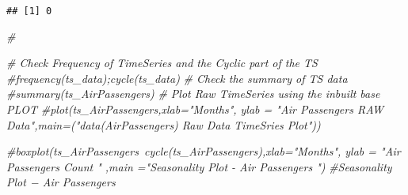 \documentclass[]{article}
\newenvironment{Shaded}{\begin{snugshade}}{\end{snugshade}}
\newcommand{\CommentTok}[1]{\textcolor[rgb]{0.56,0.35,0.01}{\textit{#1}}}
\begin{document}
\begin{verbatim}
## [1] 0
\end{verbatim}

\begin{Shaded}
\begin{Highlighting}[]
\CommentTok{# }
\end{Highlighting}
\end{Shaded}

\begin{Shaded}
\begin{Highlighting}[]
\CommentTok{# Check Frequency of TimeSeries and the Cyclic part of the TS }
\CommentTok{#frequency(ts_data);cycle(ts_data)}
\CommentTok{# Check the summary of TS data }
\CommentTok{#summary(ts_AirPassengers)}
\CommentTok{# Plot Raw TimeSeries using the inbuilt base PLOT }
\CommentTok{#plot(ts_AirPassengers,xlab="Months", ylab = "Air Passengers RAW Data",main=("data(AirPassengers) Raw Data TimeSries Plot"))}
\end{Highlighting}
\end{Shaded}

\begin{Shaded}
\begin{Highlighting}[]
\CommentTok{#boxplot(ts_AirPassengers~cycle(ts_AirPassengers),xlab="Months", ylab = "Air Passengers Count " ,main ="Seasonality Plot - Air Passengers ")}
\CommentTok{#Seasonality Plot − Air Passengers}
\end{Highlighting}
\end{Shaded}
\end{document}
